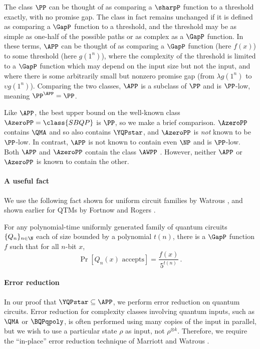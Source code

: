 \documentclass{toc}
\begin{document}
The class $\PP$ can be thought of as comparing a $\sharpP$ function
to a threshold exactly, with no promise gap.
The class in fact remains unchanged if it is defined as comparing a $\GapP$ function
to a threshold, and the threshold may be as simple as one-half of the possible paths or as complex as a
$\GapP$ function.
In these terms,
$\APP$ can be thought of as comparing a $\GapP$ function (here $f(x)$) to some threshold
(here $g(1^n)$),
where the complexity of the threshold is limited to a $\GapP$ function which may
depend on the input size but not the input,
and where there is some arbitrarily small but nonzero promise gap
(from $\lambda g(1^n)$ to $\upsilon g(1^n)$).
Comparing the two classes,
$\APP$ is a subclass of $\PP$ and is $\PP$-low, meaning $\PP^\APP = \PP$.

%
%
%
%
%
Like $\APP$, 
the best upper bound on the
well-known class $\AzeroPP=\class{SBQP}$ \cite{kuperberg2015hard}
is $\PP$,
so we make a brief comparison.
%
$\AzeroPP$ contains $\QMA$ \cite{vyalyi03}
and so also contains $\YQPstar$,
and $\AzeroPP$ is \emph{not} known to be $\PP$-low.
In contrast, $\APP$ is not known to contain even $\NP$ and is $\PP$-low.
Both $\APP$ and $\AzeroPP$ contain the class $\AWPP$ \cite{fenner2003pp,vyalyi03}.
However,
neither $\APP$ or $\AzeroPP$ is known to contain the other.

\paragraph{A useful fact}
We use the following fact shown for uniform circuit families by Watrous
\cite[Section~IV.5]{watrous2008quantum}, and shown earlier for QTMs by Fortnow and
Rogers \cite{fortnow1999complexity}.

\begin{lemma}\label{lem:quantumGapP}
	For any polynomial-time uniformly generated family of quantum circuits
	$\{Q_n\}_{n\in \N}$ each of
	size bounded by a polynomial $t(n)$,
	there is a $\GapP$ function $f$ such that for all $n$-bit $x$,
	\[
	\Pr\left[Q_n(x)\text{ accepts}\right] = \frac{f(x)}{5^{t(n)}} \, .
	\]
\end{lemma}

\paragraph{Error reduction}

In our proof that $\YQPstar\subseteq \APP$, we perform error reduction on quantum circuits.
Error reduction for complexity classes involving quantum inputs, such as $\QMA$ or $\BQPqpoly$,
is often performed using many copies of the input in parallel,
but we wish to use a particular state $\rho$ as input, not $\rho^{\otimes k}$.
Therefore,
we require the ``in-place'' error reduction technique of
Marriott and Watrous \cite{marriott2005quantum}.
\end{document}
